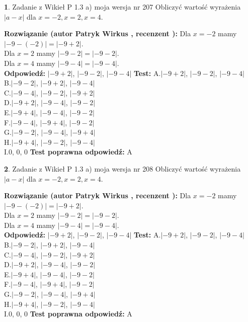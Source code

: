 \documentclass[12pt, a4paper]{article}
\theoremstyle{definition} %
\newtheorem{zad}{}
\newcommand{\zadStart}[1]{\begin{zad}#1\newline}
\newcommand{\zadStop}{\end{zad}}
\newcommand{\rozwStart}[2]{\noindent \textbf{Rozwiązanie (autor #1 , recenzent #2): }\newline}
\newcommand{\rozwStop}{\newline}
\newcommand{\odpStart}{\noindent \textbf{Odpowiedź:}\newline}
\newcommand{\odpStop}{\newline}
\newcommand{\testStart}{\noindent \textbf{Test:}\newline}
\newcommand{\testStop}{\newline}
\newcommand{\kluczStart}{\noindent \textbf{Test poprawna odpowiedź:}\newline}
\newcommand{\kluczStop}{\newline}
\begin{document}
\zadStart{Zadanie z Wikieł P 1.3 a) moja wersja nr 207}
Obliczyć wartość wyrażenia $|a - x|$ dla $x=-2,x=2,x=4$.
\zadStop
\rozwStart{Patryk Wirkus}{}
Dla $x = -2$ mamy $|-9 - (-2)| = |-9 + 2|$.\\
Dla $x = 2$ mamy $|-9 - 2| = |-9 - 2|$.\\
Dla $x = 4$ mamy $|-9 - 4| = |-9 - 4|$.\\
\rozwStop
\odpStart
$|-9 + 2|$, $|-9 - 2|$, $|-9 - 4|$
\odpStop
\testStart
A.$|-9 + 2|$, $|-9 - 2|$, $|-9 - 4|$\\
B.$|-9 - 2|$, $|-9 + 2|$, $|-9 - 4|$\\
C.$|-9 - 4|$, $|-9 - 2|$, $|-9 + 2|$\\
D.$|-9 + 2|$, $|-9 - 4|$, $|-9 - 2|$\\
E.$|-9 + 4|$, $|-9 - 4|$, $|-9 - 2|$\\
F.$|-9 - 4|$, $|-9 + 4|$, $|-9 - 2|$\\
G.$|-9 - 2|$, $|-9 - 4|$, $|-9 + 4|$\\
H.$|-9 + 4|$, $|-9 - 2|$, $|-9 - 4|$\\
I.$0$, $0$, $0$
\testStop
\kluczStart
A
\kluczStop



\zadStart{Zadanie z Wikieł P 1.3 a) moja wersja nr 208}
Obliczyć wartość wyrażenia $|a - x|$ dla $x=-2,x=2,x=4$.
\zadStop
\rozwStart{Patryk Wirkus}{}
Dla $x = -2$ mamy $|-9 - (-2)| = |-9 + 2|$.\\
Dla $x = 2$ mamy $|-9 - 2| = |-9 - 2|$.\\
Dla $x = 4$ mamy $|-9 - 4| = |-9 - 4|$.\\
\rozwStop
\odpStart
$|-9 + 2|$, $|-9 - 2|$, $|-9 - 4|$
\odpStop
\testStart
A.$|-9 + 2|$, $|-9 - 2|$, $|-9 - 4|$\\
B.$|-9 - 2|$, $|-9 + 2|$, $|-9 - 4|$\\
C.$|-9 - 4|$, $|-9 - 2|$, $|-9 + 2|$\\
D.$|-9 + 2|$, $|-9 - 4|$, $|-9 - 2|$\\
E.$|-9 + 4|$, $|-9 - 4|$, $|-9 - 2|$\\
F.$|-9 - 4|$, $|-9 + 4|$, $|-9 - 2|$\\
G.$|-9 - 2|$, $|-9 - 4|$, $|-9 + 4|$\\
H.$|-9 + 4|$, $|-9 - 2|$, $|-9 - 4|$\\
I.$0$, $0$, $0$
\testStop
\kluczStart
A
\kluczStop
\end{document}
